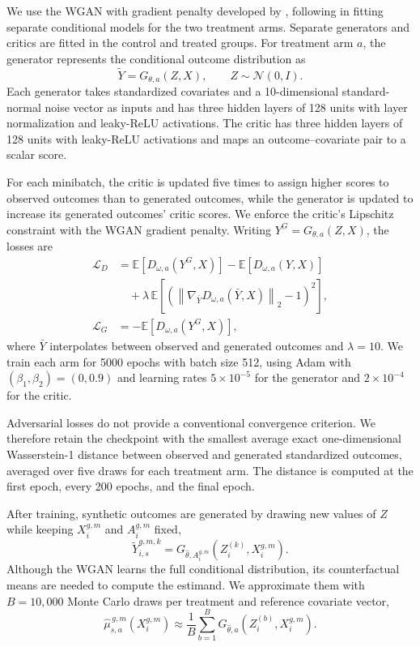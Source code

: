 We use the WGAN with gradient penalty developed by , following  in fitting separate conditional models for the two treatment arms. Separate generators and critics are fitted in the control and treated groups. For treatment arm \(a\), the generator represents the conditional outcome distribution as
\[
\widetilde Y
=
G_{\theta,a}(Z,X),
\qquad
Z\sim\mathcal N(0,I).
\]
Each generator takes standardized covariates and a 10-dimensional standard-normal noise vector as inputs and has three hidden layers of 128 units with layer normalization and leaky-ReLU activations. The critic has three hidden layers of 128 units with leaky-ReLU activations and maps an outcome--covariate pair to a scalar score.

For each minibatch, the critic is updated five times to assign higher scores to observed outcomes than to generated outcomes, while the generator is updated to increase its generated outcomes' critic scores. We enforce the critic's Lipschitz constraint with the WGAN gradient penalty. Writing \(Y^G=G_{\theta,a}(Z,X)\), the losses are
\[
\begin{aligned}
\mathcal L_D
&=
\mathbb E\!\left[D_{\omega,a}(Y^G,X)\right]
-\mathbb E\!\left[D_{\omega,a}(Y,X)\right]\\
&\quad+\lambda\,
\mathbb E\!\left[\left(\left\lVert\nabla_{\bar Y}D_{\omega,a}(\bar Y,X)\right\rVert_2-1\right)^2\right],\\
\mathcal L_G
&=-\mathbb E\!\left[D_{\omega,a}(Y^G,X)\right],
\end{aligned}
\]
where \(\bar Y\) interpolates between observed and generated outcomes and \(\lambda=10\). We train each arm for 5000 epochs with batch size 512, using Adam with \((\beta_1,\beta_2)=(0,0.9)\) and learning rates \(5\times10^{-5}\) for the generator and \(2\times10^{-4}\) for the critic.

Adversarial losses do not provide a conventional convergence criterion. We therefore retain the checkpoint with the smallest average exact one-dimensional Wasserstein-1 distance between observed and generated standardized outcomes, averaged over five draws for each treatment arm. The distance is computed at the first epoch, every 200 epochs, and the final epoch.

After training, synthetic outcomes are generated by drawing new values of \(Z\) while keeping \(X_i^{g,m}\) and \(A_i^{g,m}\) fixed,
\[
\widetilde Y_{i,s}^{g,m,k}
=
G_{\widehat{\theta},A_i^{g,m}}
\left(
Z_i^{(k)},X_i^{g,m}
\right).
\]
Although the WGAN learns the full conditional distribution, its counterfactual means are needed to compute the estimand. We approximate them with \(B=10{,}000\) Monte Carlo draws per treatment and reference covariate vector,
\[
\widehat{\mu}_{s,a}^{\,g,m}(X_i^{g,m})
\approx
\frac{1}{B}
\sum_{b=1}^{B}
G_{\widehat{\theta},a}
\left(
Z_i^{(b)},X_i^{g,m}
\right).
\]

